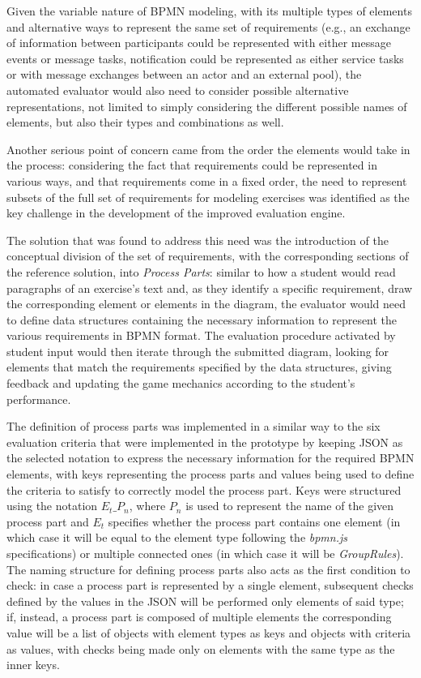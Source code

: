 Given the variable nature of BPMN modeling, with its multiple types of elements and alternative ways to represent the same set of requirements (e.g., an exchange of information between participants could be represented with either message events or message tasks, notification could be represented as either service tasks or with message exchanges between an actor and an external pool), the automated evaluator would also need to consider possible alternative representations, not limited to simply considering the different possible names of elements, but also their types and combinations as well. 

Another serious point of concern came from the order the elements would take in the process: considering the fact that requirements could be represented in various ways, and that requirements come in a fixed order, the need to represent subsets of the full set of requirements for modeling exercises was identified as the key challenge in the development of the improved evaluation engine.

The solution that was found to address this need was the introduction of the conceptual division of the set of requirements, with the corresponding sections of the reference solution, into \textit{Process Parts}: similar to how a student would read paragraphs of an exercise's text and, as they identify a specific requirement, draw the corresponding element or elements in the diagram, the evaluator would need to define data structures containing the necessary information to represent the various requirements in BPMN format. The evaluation procedure activated by student input would then iterate through the submitted diagram, looking for elements that match the requirements specified by the data structures, giving feedback and updating the game mechanics according to the student's performance.

The definition of process parts was implemented in a similar way to the six evaluation criteria that were implemented in the prototype by keeping JSON as the selected notation to express the necessary information for the required BPMN elements, with keys representing the process parts and values being used to define the criteria to satisfy to correctly model the process part. Keys were structured using the notation \textit{$E_t\_P_n$}, where \textit{$P_n$} is used to represent the name of the given process part and \textit{$E_t$} specifies whether the process part contains one element (in which case it will be equal to the element type following the \textit{bpmn.js} specifications) or multiple connected ones (in which case it will be \textit{GroupRules}). The naming structure for defining process parts also acts as the first condition to check: in case a process part is represented by a single element, subsequent checks defined by the values in the JSON will be performed only elements of said type; if, instead, a process part is composed of multiple elements the corresponding value will be a list of objects with element types as keys and objects with criteria as values, with checks being made only on elements with the same type as the inner keys.



